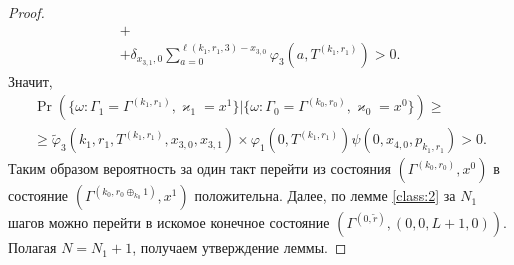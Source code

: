 \documentclass[a4paper,12pt,russian]{extarticle}
\begin{document}
\begin{proof}
\begin{multline*}
+\\+\delta_{x_{3,1},0} \sum_{a=0}^{\ell(k_1,r_1,3)-x_{3,0}}\varphi_3 (a,T^{(k_1,r_1)})>0.
\end{multline*}
Значит,
\begin{multline*}
\Pr (\{\omega\colon \Gamma_{1}=\Gamma^{(k_1,r_1)},\varkappa_{1}=x^1\}|\{\omega\colon  \Gamma_{0}=\Gamma^{(k_0,r_0)},\varkappa_0=x^0\})\geqslant \\
\geqslant \widetilde{\varphi}_3(k_1,r_1,T^{(k_1,r_1)},x_{3,0},x_{3,1})
\times
\varphi_1(0,T^{(k_1,r_1)})  \psi(0,x_{4,0}, p_{k_1,r_1}) > 0.
\end{multline*}
Таким образом вероятность за один такт перейти из состояния $(\Gamma^{(k_0,r_0)}, x^0)$ в состояние $ (\Gamma^{(k_0,r_0\oplus_{k_0}1)}, x^1)$ положительна.
Далее, по лемме \eqref{class:2} за $N_1$ шагов можно перейти в искомое конечное состояние $(\Gamma^{(0,\tilde{r} )}, (0,0,L+1,0))$. Полагая $N=N_1+1$, получаем утверждение леммы.
\end{proof}
\end{document}
